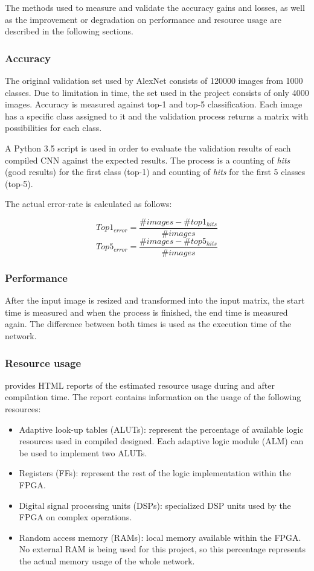 \begin{enumerate}
The methods used to measure and validate the accuracy gains and losses, as well as the
improvement or degradation on performance and resource usage are described in the following
sections.

\subsubsection{Accuracy}

The original validation set used by AlexNet consists of 120000 images from 1000 classes.
Due to limitation in time, the set used in the project consists of only 4000 images.
Accuracy is measured against top-1 and top-5 classification. Each image has a specific class
assigned to it and the validation process returns a matrix with possibilities
for each class.

A Python 3.5 script is used in order to evaluate the validation results of each compiled
CNN against the expected results. The process is a counting of \textit{hits} (good results) for
the first class (top-1) and counting of \textit{hits} for the first 5 classes (top-5).

The actual error-rate is calculated as follows:

$$
Top1_{error} = \frac{\#images - \#top1_{hits}}{\#images}
$$
$$
Top5_{error} = \frac{\#images - \#top5_{hits}}{\#images}
$$

\subsubsection{Performance}

After the input image is resized and transformed into the input matrix, the start time
is measured and when the process is finished, the end time is measured again. The difference
between both times is used as the execution time of the network.

\subsubsection{Resource usage}

\intelOCL provides HTML reports of the estimated resource usage during and after compilation time.
The report contains information on the usage of the following resources:
\begin{itemize}
    \item Adaptive look-up tables (ALUTs): represent the percentage of
    available logic resources used in compiled designed. Each adaptive logic module (ALM)
    can be used to implement two ALUTs.
    \item Registers (FFs): represent the rest of the logic implementation within the
    FPGA.
    \item Digital signal processing units (DSPs): specialized DSP units used by the FPGA
    on complex operations.
    \item Random access memory (RAMs): local memory available within the FPGA. No external RAM
    is being used for this project, so this percentage represents the actual memory usage
    of the whole network.
\end{itemize}


\end{enumerate}

